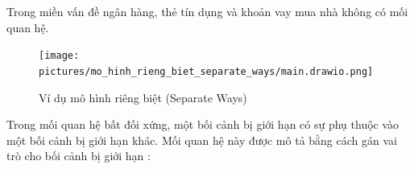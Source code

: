 











\begin{example} Trong miền vấn đề ngân hàng, thẻ tín dụng và khoản vay mua nhà không có mối quan hệ.

    \begin{figure}[H]

        \centering

        \texttt{[image: pictures/mo\_hinh\_rieng\_biet\_separate\_ways/main.drawio.png]}

        \caption{Ví dụ mô hình riêng biệt (Separate Ways)}

    \end{figure}

\end{example}



Trong mối quan hệ bất đối xứng, một bối cảnh bị giới hạn có sự phụ thuộc vào một bối cảnh bị giới hạn khác. Mối quan hệ này được mô tả bằng cách gán vai trò cho bối cảnh bị giới hạn :

